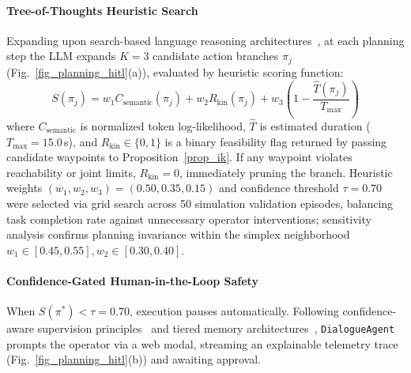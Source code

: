 \documentclass[journal]{IEEEtran}
\begin{document}
\paragraph{Tree-of-Thoughts Heuristic Search}
Expanding upon search-based language reasoning architectures~\cite{aria_132_yao_2023_tree,aria_080_zhou_2024_language}, at each planning step the LLM expands $K=3$ candidate action branches $\pi_j$ (Fig.~\ref{fig_planning_hitl}(a)), evaluated by heuristic scoring function:
\begin{equation}
S(\pi_j) = w_1 C_{\text{semantic}}(\pi_j) + w_2 R_{\text{kin}}(\pi_j) + w_3 \left(1 - \frac{\hat{T}(\pi_j)}{T_{\text{max}}}\right)
\end{equation}
where $C_{\text{semantic}}$ is normalized token log-likelihood, $\hat{T}$ is estimated duration ($T_{\text{max}} = 15.0$\,s), and $R_{\text{kin}} \in \{0, 1\}$ is a binary feasibility flag returned by passing candidate waypoints to Proposition~\ref{prop_ik}. If any waypoint violates reachability or joint limits, $R_{\text{kin}} = 0$, immediately pruning the branch. Heuristic weights $(w_1, w_2, w_3) = (0.50, 0.35, 0.15)$ and confidence threshold $\tau = 0.70$ were selected via grid search across 50 simulation validation episodes, balancing task completion rate against unnecessary operator interventions; sensitivity analysis confirms planning invariance within the simplex neighborhood $w_1 \in [0.45, 0.55], w_2 \in [0.30, 0.40]$.

\paragraph{Confidence-Gated Human-in-the-Loop Safety}
When $S(\pi^*) < \tau = 0.70$, execution pauses automatically. Following confidence-aware supervision principles~\cite{aria_039_doan_2022_asking} and tiered memory architectures~\cite{aria_088_packer_2023_memgpt}, \texttt{DialogueAgent} prompts the operator via a web modal, streaming an explainable telemetry trace (Fig.~\ref{fig_planning_hitl}(b)) and awaiting approval.
\end{document}
